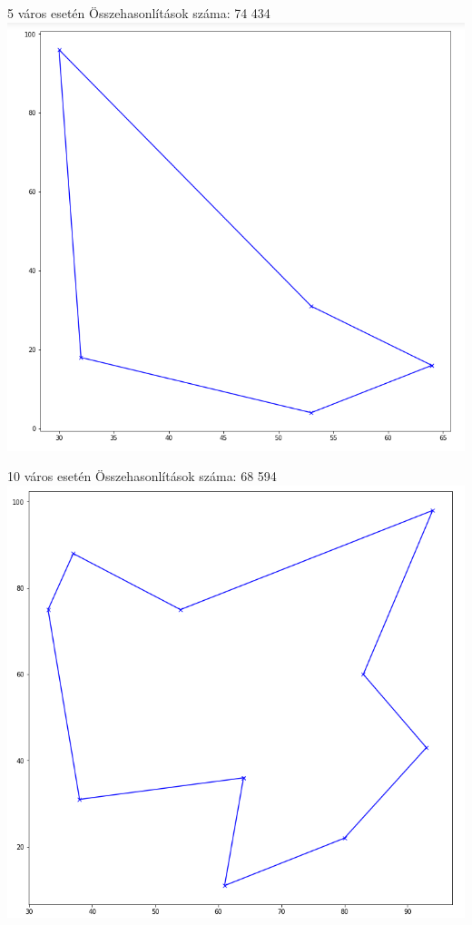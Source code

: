 
5 város esetén
Összehasonlítások száma: 74 434
\includegraphics[scale=0.4]{images/5.png}

10 város esetén
Összehasonlítások száma: 68 594
\includegraphics[scale=0.4]{images/10.png}

